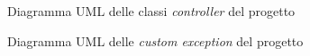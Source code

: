 \begin{figure}[h]
	\centering
	\caption{Diagramma UML delle classi \emph{controller} del progetto}
	\label{fig:one}
\end{figure}
\newpage
\begin{figure}[h]
	\centering
	\caption{Diagramma UML delle \emph{custom exception} del progetto}
	\label{fig:one}
\end{figure}

